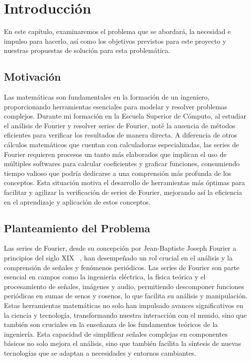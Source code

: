 \chapter{Introducción}\label{ch:Introducción}
En este capítulo, examinaremos el problema que se abordará, la necesidad e impulso para hacerlo, así como los objetivos previstos para este proyecto y nuestras propuestas de solución para esta problemática. 

\section{Motivación}
Las matemáticas son fundamentales en la formación de un ingeniero, proporcionando herramientas esenciales para modelar y resolver problemas complejos. Durante mi formación en la Escuela Superior de Cómputo, al estudiar el análisis de Fourier y resolver series de Fourier, noté la ausencia de métodos eficientes para verificar los resultados de manera directa. A diferencia de otros cálculos matemáticos que cuentan con calculadoras especializadas, las series de Fourier requieren procesos un tanto más elaborados que implican el uso de múltiples softwares para calcular coeficientes y graficar funciones, consumiendo tiempo valioso que podría dedicarse a una comprensión más profunda de los conceptos. Esta situación motiva el desarrollo de herramientas más óptimas para facilitar y agilizar la verificación de series de Fourier, mejorando así la eficiencia en el aprendizaje y aplicación de estos conceptos.

\section{Planteamiento del Problema}
Las series de Fourier, desde su concepción por Jean-Baptiste Joseph Fourier a principios del siglo XIX ~\cite{almira2017fourier}, han desempeñado un rol crucial en el análisis y la comprensión de señales y fenómenos periódicos. Las series de Fourier son parte esencial en campos como la ingeniería eléctrica, la física teórica y el procesamiento de señales, imágenes y audio, permitiendo descomponer funciones periódicas en sumas de senos y cosenos, lo que facilita su análisis y manipulación. Estas herramientas matemáticas no solo han impulsado avances significativos en la ciencia y tecnología, transformando nuestra interacción con el mundo, sino que también son cruciales en la enseñanza de los fundamentos teóricos de la ingeniería. Esta capacidad de simplificar señales complejas en componentes básicos no solo mejora el análisis, sino que también facilita la síntesis de nuevas tecnologías que se adaptan a necesidades y entornos cambiantes.

